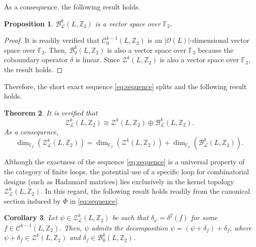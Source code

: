 \documentclass[11pt,a4paper]{article}
\newtheorem{theorem}{Theorem}[section]
\newtheorem{proposition}[theorem]{Proposition}
\newtheorem{corollary}[theorem]{Corollary}
\begin{document}
As a consequence, the following result holds.

\begin{proposition} $\mathcal{B}^k_\mathcal{L}(L,\mathbb{Z}_2)$ is a vector space over $\mathbb{F}_2$.
\end{proposition}

\begin{proof} It is readily verified that $\mathcal{C}_0^{k-1}(L,\mathbb{Z}_2)$ is an $|\mathcal{O}(L)|$-dimensional vector space over $\mathbb{F}_2$. Then, $\mathcal{B}^k_0(L,\mathbb{Z}_2)$ is also a vector space over $\mathbb{F}_2$ because the coboundary operator $\delta$ is linear. Since $\mathcal{Z}^k(L,\mathbb{Z}_2)$ is also a vector space over $\mathbb{F}_2$, the result holds.
\end{proof}

Therefore, the short exact sequence \eqref{eq:sequence} splits and the following result holds.

\begin{theorem}\label{theorem_family_cochains_a} It is verified that
\begin{equation}\label{eq:decomposition}
\mathcal{Z}_\mathcal{L}^k(L,\mathbb{Z}_2)\cong \mathcal{Z}^k(L,\mathbb{Z}_2)\oplus \mathcal{B}_\mathcal{L}^k(L,\mathbb{Z}_2).
\end{equation}
As a consequence,
\[\dim_{\mathbb{F}_2}\left(\mathcal{Z}_\mathcal{L}^k(L,\mathbb{Z}_2)\right)=\dim_{\mathbb{F}_2}\left(\mathcal{Z}^k(L,\mathbb{Z}_2)\right)+\dim_{\mathbb{F}_2}\left(\mathcal{B}_\mathcal{L}^k(L,\mathbb{Z}_2)\right).\]
\end{theorem}

Although the exactness of the sequence \eqref{eq:sequence} is a universal property of the category of finite loops, the potential use of a specific loop for combinatorial designs (such as Hadamard matrices) lies exclusively in the kernel topology $\mathcal{Z}_\mathcal{L}^k(L,\mathbb{Z}_2)$. In this regard, the following result holds readily from the canonical section induced by $\Phi$ in \eqref{eq:sequence}.

\begin{corollary}\label{corollary_family_cochains} Let $\psi\in \mathcal{Z}_\mathcal{L}^k(L,\mathbb{Z}_2)$ be such that $\delta_\psi=\delta^2(f)$ for some $f\in \mathcal{C}^{k-1}(L,\mathbb{Z}_2)$. Then, $\psi$ admits the decomposition $\psi=(\psi+\delta_f)+\delta_f$, where $\psi+\delta_f\in \mathcal{Z}^k(L,\mathbb{Z}_2)$ and $\delta_f\in \mathcal{B}_0^k(L,\mathbb{Z}_2)$.
\end{corollary}
\end{document}
